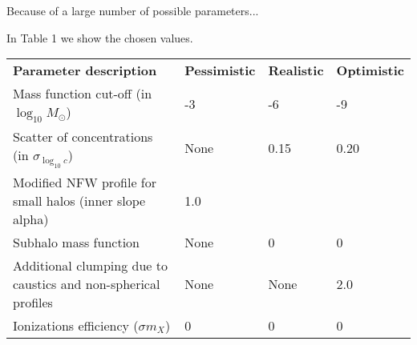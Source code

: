Because of a large number of possible parameters...

In Table 1 we show the chosen values.

\begin{table}
    \begin{tabular}{llll}
    \textbf{Parameter description}                                    & \textbf{Pessimistic} & \textbf{Realistic} & \textbf{Optimistic} \hline \hline \\
    Mass function cut-off (in $\log_{10}M_\odot$)        & -3 & -6 & -9 \\
    Scatter of concentrations (in $\sigma_{\log_{10}c}$)              & None & 0.15 & 0.20 \\
    Modified NFW profile for small halos (inner slope alpha) & 1.0 & \cite{Ishiyama_2014} &  \cite{Ishiyama_2014} \\
    Subhalo mass function & None & 0 & 0 \\
    Additional clumping due to caustics and non-spherical profiles & None & None & 2.0
\\    
    Ionizations efficiency ($\sigma m_X$) & 0 & 0 & 0
\\    \end{tabular}
\end{table}